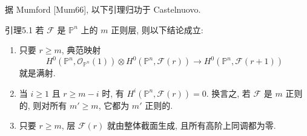 据 Mumford [Mum66], 以下引理归功于 Castelnuovo.
\begin{origstatement}{引理}{5.1}\label{ch05:lem5.1}
若 $\mathcal F$ 是 $\mathbb P^n$ 上的 $m$ 正则层, 则以下结论成立:
\begin{enumerate}
\item[(a)] 只要 $r\geq m$, 典范映射
\[
 H^0(\mathbb P^n,\mathcal O_{\mathbb P^n}(1))\otimes H^0(\mathbb P^n,\mathcal F(r))
 \longrightarrow H^0(\mathbb P^n,\mathcal F(r+1))
\]
就是满射.
\item[(b)] 当 $i\geq1$ 且 $r\geq m-i$ 时, 有 $H^i(\mathbb P^n,\mathcal F(r))=0$. 换言之, 若 $\mathcal F$ 是 $m$ 正则的, 则对所有 $m'\geq m$, 它都为 $m'$ 正则的.
\item[(c)] 只要 $r\geq m$, 层 $\mathcal F(r)$ 就由整体截面生成, 且所有高阶上同调都为零.
\end{enumerate}
\end{origstatement}
